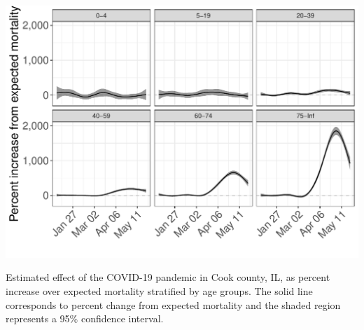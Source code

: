\documentclass[11pt]{article}
\begin{document}
\begin{suppfigure}[ht]
	\centering
	\includegraphics[width=1\linewidth]{figs/supp-figure-6.pdf} 
	\caption{Estimated effect of the COVID-19 pandemic in Cook county, IL, as percent increase over expected mortality stratified by age groups. The solid line corresponds to percent change from expected mortality and the shaded region represents a 95\% confidence interval.}
	\label{supp-fig:cook-agegroups}
\end{suppfigure}
\end{document}
